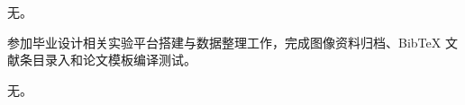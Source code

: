 \begin{njustappendix}
无。

参加毕业设计相关实验平台搭建与数据整理工作，完成图像资料归档、BibTeX 文献条目录入和论文模板编译测试。

无。
\end{njustappendix}
